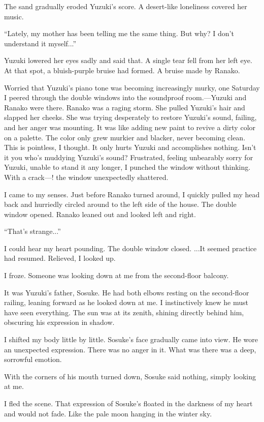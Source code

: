 \documentclass[
    a4paper,
    12pt,
    twoside,
    openany,
    UTF8,
    fontset=windows
]{ctexbook}
\begin{document}
The sand gradually eroded Yuzuki's score. A desert-like loneliness covered her music.

``Lately, my mother has been telling me the same thing. But why? I don't understand it myself...''

Yuzuki lowered her eyes sadly and said that. A single tear fell from her left eye. At that spot, a bluish-purple bruise had formed. A bruise made by Ranako.

Worried that Yuzuki's piano tone was becoming increasingly murky, one Saturday I peered through the double windows into the soundproof room.---Yuzuki and Ranako were there. Ranako was a raging storm. She pulled Yuzuki's hair and slapped her cheeks. She was trying desperately to restore Yuzuki's sound, failing, and her anger was mounting. It was like adding new paint to revive a dirty color on a palette. The color only grew murkier and blacker, never becoming clean. This is pointless, I thought. It only hurts Yuzuki and accomplishes nothing. Isn't it you who's muddying Yuzuki's sound? Frustrated, feeling unbearably sorry for Yuzuki, unable to stand it any longer, I punched the window without thinking. With a crack---! the window unexpectedly shattered.

I came to my senses. Just before Ranako turned around, I quickly pulled my head back and hurriedly circled around to the left side of the house. The double window opened. Ranako leaned out and looked left and right.

``That's strange...''

I could hear my heart pounding. The double window closed. ...It seemed practice had resumed. Relieved, I looked up.

I froze. Someone was looking down at me from the second-floor balcony.

It was Yuzuki's father, Sosuke. He had both elbows resting on the second-floor railing, leaning forward as he looked down at me. I instinctively knew he must have seen everything. The sun was at its zenith, shining directly behind him, obscuring his expression in shadow.

I shifted my body little by little. Sosuke's face gradually came into view. He wore an unexpected expression. There was no anger in it. What was there was a deep, sorrowful emotion.

With the corners of his mouth turned down, Sosuke said nothing, simply looking at me.

I fled the scene. That expression of Sosuke's floated in the darkness of my heart and would not fade. Like the pale moon hanging in the winter sky.
\end{document}
